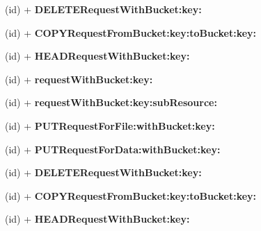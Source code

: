 \begin{DoxyCompactItemize}
\item 
\hypertarget{interface_a_s_i_s3_object_request_a0602fac9aee5730f513b0a49e2be0dd9}{
(id) + {\bfseries \-D\-E\-L\-E\-T\-E\-Request\-With\-Bucket\-:key\-:}}
\label{interface_a_s_i_s3_object_request_a0602fac9aee5730f513b0a49e2be0dd9}

\item 
\hypertarget{interface_a_s_i_s3_object_request_a0048cc08b9cfef9c78abd81faa472d48}{
(id) + {\bfseries \-C\-O\-P\-Y\-Request\-From\-Bucket\-:key\-:to\-Bucket\-:key\-:}}
\label{interface_a_s_i_s3_object_request_a0048cc08b9cfef9c78abd81faa472d48}

\item 
\hypertarget{interface_a_s_i_s3_object_request_a88538201f1def9da2ff385880b78c8ef}{
(id) + {\bfseries \-H\-E\-A\-D\-Request\-With\-Bucket\-:key\-:}}
\label{interface_a_s_i_s3_object_request_a88538201f1def9da2ff385880b78c8ef}

\item 
\hypertarget{interface_a_s_i_s3_object_request_a8fc06d7585b85db69f81678fc1560ab0}{
(id) + {\bfseries request\-With\-Bucket\-:key\-:}}
\label{interface_a_s_i_s3_object_request_a8fc06d7585b85db69f81678fc1560ab0}

\item 
\hypertarget{interface_a_s_i_s3_object_request_aac357e6e8d9eab201a5d97c6e2ad1574}{
(id) + {\bfseries request\-With\-Bucket\-:key\-:sub\-Resource\-:}}
\label{interface_a_s_i_s3_object_request_aac357e6e8d9eab201a5d97c6e2ad1574}

\item 
\hypertarget{interface_a_s_i_s3_object_request_a07ff4bdb86902d59cb602be9bdc7ac14}{
(id) + {\bfseries \-P\-U\-T\-Request\-For\-File\-:with\-Bucket\-:key\-:}}
\label{interface_a_s_i_s3_object_request_a07ff4bdb86902d59cb602be9bdc7ac14}

\item 
\hypertarget{interface_a_s_i_s3_object_request_a06b5bf032c9b54a0fd0b17e0d1fecad5}{
(id) + {\bfseries \-P\-U\-T\-Request\-For\-Data\-:with\-Bucket\-:key\-:}}
\label{interface_a_s_i_s3_object_request_a06b5bf032c9b54a0fd0b17e0d1fecad5}

\item 
\hypertarget{interface_a_s_i_s3_object_request_a0602fac9aee5730f513b0a49e2be0dd9}{
(id) + {\bfseries \-D\-E\-L\-E\-T\-E\-Request\-With\-Bucket\-:key\-:}}
\label{interface_a_s_i_s3_object_request_a0602fac9aee5730f513b0a49e2be0dd9}

\item 
\hypertarget{interface_a_s_i_s3_object_request_a0048cc08b9cfef9c78abd81faa472d48}{
(id) + {\bfseries \-C\-O\-P\-Y\-Request\-From\-Bucket\-:key\-:to\-Bucket\-:key\-:}}
\label{interface_a_s_i_s3_object_request_a0048cc08b9cfef9c78abd81faa472d48}

\item 
\hypertarget{interface_a_s_i_s3_object_request_a88538201f1def9da2ff385880b78c8ef}{
(id) + {\bfseries \-H\-E\-A\-D\-Request\-With\-Bucket\-:key\-:}}
\label{interface_a_s_i_s3_object_request_a88538201f1def9da2ff385880b78c8ef}

\end{DoxyCompactItemize}

